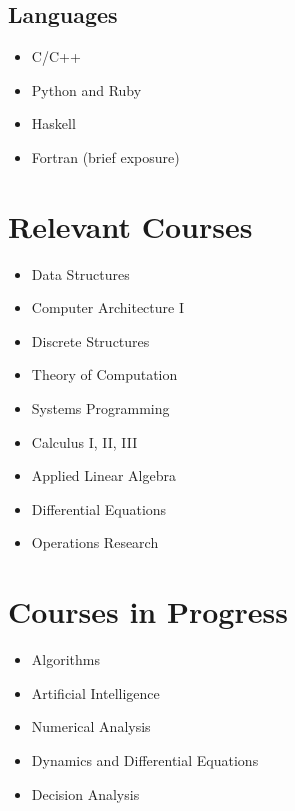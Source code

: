 \documentclass[letterpaper,10pt]{article}
\begin{document}
\subsection{Languages}
\begin{itemize}
    \item C/C++
    \item Python and Ruby
    \item Haskell
    \item Fortran (brief exposure)
\end{itemize}

\pagebreak

\section{Relevant Courses}
\begin{itemize}
    \item Data Structures
    \item Computer Architecture I
    \item Discrete Structures
    \item Theory of Computation
    \item Systems Programming
    \item Calculus I, II, III
    \item Applied Linear Algebra
    \item Differential Equations
    \item Operations Research
\end{itemize}

\section{Courses in Progress}
\begin{itemize}
    \item Algorithms
    \item Artificial Intelligence
    \item Numerical Analysis
    \item Dynamics and Differential Equations
    \item Decision Analysis
\end{itemize}
\end{document}
